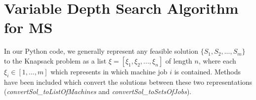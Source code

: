 \documentclass[12pt,a4paper,reqno]{article}
\begin{document}
\newpage













\section{Variable Depth Search Algorithm for MS}

In our Python code, we generally represent any feasible solution $\{S_1,S_2,...,S_m\}$ to the Knapsack problem as a list $\xi = [\xi_1,\xi_2,...,\xi_n]$ of length $n$, where each $\xi_i \in [1,...,m]$ which represents in which machine job $i$ is contained. Methods have been included which convert the solutions between these two representations (\textit{convertSol\_toListOfMachines} and \textit{convertSol\_toSetsOfJobs}). \\
\end{document}
